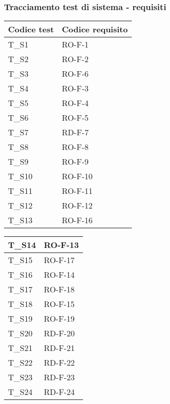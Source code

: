 \subsubsection{Tracciamento test di sistema - requisiti}
\begin{center}
    \renewcommand{\arraystretch}{1.8}
    \begin{tabular}{|m{6em}|m{8em}|}
        \hline
        \textbf{Codice test} & \textbf{Codice requisito}\\
        \hline
        T\_S1 & RO-F-1\\
        \hline
        T\_S2 & RO-F-2\\
        \hline
        T\_S3 & RO-F-6\\
        \hline
        T\_S4 & RO-F-3\\
        \hline
        T\_S5 & RO-F-4\\
        \hline
        T\_S6 & RO-F-5\\
        \hline
        T\_S7 & RD-F-7\\
        \hline
        T\_S8 & RO-F-8\\
        \hline
        T\_S9 & RO-F-9\\
        \hline
        T\_S10 & RO-F-10\\
        \hline
        T\_S11 & RO-F-11\\
        \hline
        T\_S12 & RO-F-12\\
        \hline
        T\_S13 & RO-F-16\\
        \hline
    \end{tabular}
    \newpage
    \renewcommand{\arraystretch}{1.8}
    \begin{tabular}{|m{6em}|m{8em}|}
        \hline
        T\_S14 & RO-F-13\\
        \hline
        T\_S15 & RO-F-17\\
        \hline
        T\_S16 & RO-F-14\\
        \hline
        T\_S17 & RO-F-18\\
        \hline
        T\_S18 & RO-F-15\\
        \hline
        T\_S19 & RO-F-19\\
        \hline
        T\_S20 & RD-F-20\\
        \hline
        T\_S21 & RD-F-21\\
        \hline
        T\_S22 & RD-F-22\\
        \hline
        T\_S23 & RD-F-23\\
        \hline
        T\_S24 & RD-F-24\\

\end{tabular}
\end{center}
